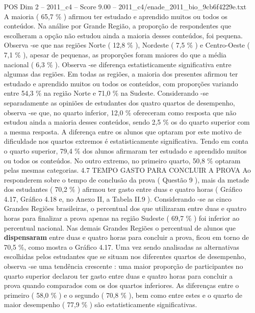 \begin{textsample}{POS Dim 2 – 2011\_c4 – Score 9.00 – 2011\_c4/enade\_2011\_bio\_9cb6f4229e.txt}
A maioria ( 65,7 \% ) afirmou ter estudado e aprendido muitos ou todos os conteúdos.
Na análise por Grande Região, a proporção de respondentes que escolheram a opção não estudou ainda a maioria desses conteúdos, foi pequena.
Observa -se que nas regiões Norte ( 12,8 \% ), Nordeste ( 7,5 \% ) e Centro-Oeste ( 7,1 \% ), apesar de pequenas, as proporções foram maiores do que a média nacional ( 6,3 \% ).
Observa -se diferença estatisticamente significativa entre algumas das regiões.
Em todas as regiões, a maioria dos presentes afirmou ter estudado e aprendido muitos ou todos os conteúdos, com proporções variando entre 54,3 \% na região Norte e 71,0 \% na Sudeste.
Considerando -se separadamente as opiniões de estudantes dos quatro quartos de desempenho, observa -se que, no quarto inferior, 12,0 \% ofereceram como resposta que não estudou ainda a maioria desses conteúdos, sendo 2,5 \% os do quarto superior com a mesma resposta.
A diferença entre os alunos que optaram por este motivo de dificuldade nos quartos extremos é estatisticamente significativa.
Tendo em conta o quarto superior, 79,4 \% dos alunos afirmaram ter estudado e aprendido muitos ou todos os conteúdos.
No outro extremo, no primeiro quarto, 50,8 \% optaram pelas mesmas categorias. 4.7 TEMPO GASTO PARA CONCLUIR A PROVA Ao responderem sobre o tempo de conclusão da prova ( Questão 9 ), mais da metade dos estudantes ( 70,2 \% ) afirmou ter gasto entre duas e quatro horas ( Gráfico 4.17, Gráfico 4.18 e, no Anexo II, a Tabela II.9 ).
Considerando -se as cinco Grandes Regiões brasileiras, o percentual dos que utilizaram entre duas e quatro horas para finalizar a prova apenas na região Sudeste ( 69,7 \% ) foi inferior ao percentual nacional.
Nas demais Grandes Regiões o percentual de alunos que \textbf{dispensaram} entre duas e quatro horas para concluir a prova, ficou em torno de 70,5 \%, como mostra o Gráfico 4.17.
Uma vez sendo analisadas as alternativas escolhidas pelos estudantes que se situam nos diferentes quartos de desempenho, observa -se uma tendência crescente : uma maior proporção de participantes no quarto superior declarou ter gasto entre duas e quatro horas para concluir a prova quando comparados com os dos quartos inferiores.
As diferenças entre o primeiro ( 58,0 \% ) e o segundo ( 70,8 \% ), bem como entre estes e o quarto de maior desempenho ( 77,9 \% ) são estatisticamente significativas.

\end{textsample}

